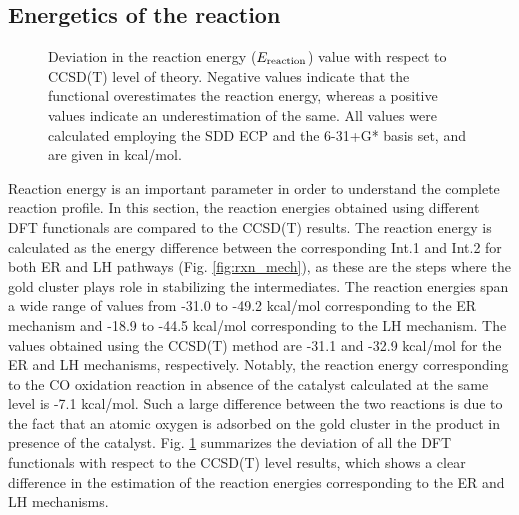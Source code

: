 \subsection{Energetics of the reaction}
\begin{figure}[!t]
        \centering
\caption{Deviation in the reaction energy ($E_{\rm{reaction}}$) value with respect to CCSD(T) level of theory. Negative values indicate that the functional overestimates the reaction energy, whereas a positive values indicate an underestimation of the same. All values were calculated employing the SDD ECP and the 6-31+G* basis set, and are given in kcal/mol. } \label{energetics_diff_ccsd}
\end{figure}
Reaction energy is an important parameter in order to understand the complete reaction profile. In this section, the reaction energies obtained using different DFT functionals are compared to the CCSD(T) results. The reaction energy is calculated as the energy difference between the corresponding Int.1 and Int.2 for both ER and LH pathways (Fig. \ref{fig:rxn_mech}), as these are the steps where the gold cluster plays role in stabilizing the intermediates. The reaction energies span a wide range of values from -31.0 to -49.2 kcal/mol corresponding to the ER mechanism and -18.9 to -44.5 kcal/mol corresponding to the LH mechanism. The values obtained using the CCSD(T) method are -31.1 and -32.9 kcal/mol for the ER and LH mechanisms, respectively. Notably, the reaction energy corresponding to the CO oxidation reaction in absence of the catalyst calculated at the same level is -7.1 kcal/mol. Such a large difference between the two reactions is due to the fact that an atomic oxygen is adsorbed on the gold cluster in the product in presence of the catalyst. Fig. \ref{energetics_diff_ccsd} summarizes the deviation of all the DFT functionals with respect to the CCSD(T) level results, which shows a clear difference in the estimation of the reaction energies corresponding to the ER and LH mechanisms. \\
